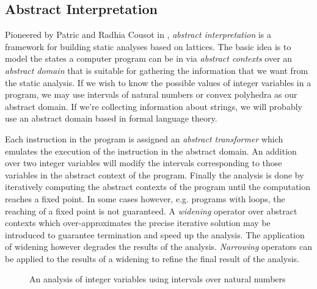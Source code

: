 
\subsection{Abstract Interpretation}
Pioneered by Patric and Radhia Cousot in \cite{Cousot77}, \emph{abstract interpretation} is a framework for building static analyses based on lattices. The basic idea is to model the states a computer program can be in via \emph{abstract contexts} over an \emph{abstract domain} that is suitable for gathering the information that we want from the static analysis. If we wish to know the possible values of integer variables in a program, we may use intervals of natural numbers or convex polyhedra as our abstract domain. If we're collecting information about strings, we will probably use an abstract domain based in formal language theory.

Each instruction in the program is assigned an \emph{abstract transformer} which emulates the execution of the instruction in the abstract domain. An addition over two integer variables will modify the intervals corresponding to those variables in the abstract context of the program. Finally the analysis is done by iteratively computing the abstract contexts of the program until the computation reaches a fixed point. In some cases however, e.g. programs with loops, the reaching of a fixed point is not guaranteed. A \emph{widening} operator over abstract contexts which over-approximates the precise iterative solution may be introduced to guarantee termination and speed up the analysis. The application of widening however degrades the results of the analysis. \emph{Narrowing} operators can be applied to the results of a widening to refine the final result of the analysis.

\begin{figure}[H]
    \centering
    \caption{An analysis of integer variables using intervals over natural numbers}
    \label{fig_absintr_intervals}
\end{figure}

